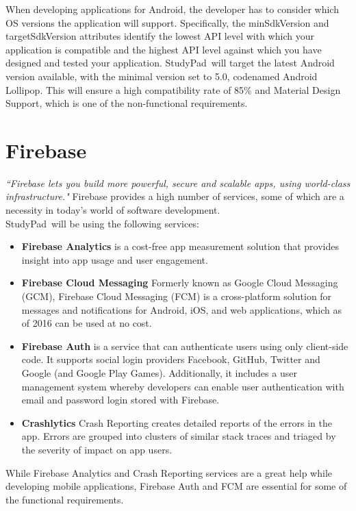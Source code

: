 \documentclass[thesis=B,english]{FITthesis}[2012/10/20]
\newcommand{\appname}{StudyPad}
\newcommand{\quoting}[1]{\textit{``#1"}}
\begin{document}
When developing applications for Android, the developer has to consider which OS versions the application will support. Specifically, the minSdkVersion and targetSdkVersion attributes  identify the lowest API level with which your application is compatible and the highest API level against which you have designed and tested your application. \appname\ will target the latest Android version available, with the minimal version set to 5.0, codenamed Android Lollipop. This will ensure a high compatibility rate of 85\% and Material Design Support, which is one of the non-functional requirements.

\section{Firebase}

\quoting{Firebase lets you build more powerful, secure and scalable apps, using world-class infrastructure.} \cite{firebase} Firebase provides a high number of services, some of which are a necessity in today's world of software development. \\\appname\ will be using the following services:
\begin{itemize}
	\item \textbf{Firebase Analytics} is a cost-free app measurement solution that provides insight into app usage and user engagement.
	\item \textbf{Firebase Cloud Messaging} Formerly known as Google Cloud Messaging (GCM), Firebase Cloud Messaging (FCM) is a cross-platform solution for messages and notifications for Android, iOS, and web applications, which as of 2016 can be used at no cost.
	\item \textbf{Firebase Auth} is a service that can authenticate users using only client-side code. It supports social login providers Facebook, GitHub, Twitter and Google (and Google Play Games). Additionally, it includes a user management system whereby developers can enable user authentication with email and password login stored with Firebase.
	\item \textbf{Crashlytics} Crash Reporting creates detailed reports of the errors in the app. Errors are grouped into clusters of similar stack traces and triaged by the severity of impact on app users.

\end{itemize}


\noindent While Firebase Analytics and Crash Reporting services are a great help while developing mobile applications, Firebase Auth and FCM are essential for some of the functional requirements. 
\end{document}
